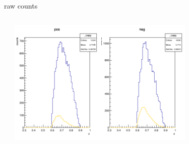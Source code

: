 \begin{frame}{raw counts}
\begin{columns}
\begin{column}[T]{0.5\textwidth}
\end{column}
\begin{column}[T]{0.5\textwidth}
\includegraphics[width = 0.7\textwidth]{results/yield/statistics/counts_x_Q2_z_0.45_4.750_0.70.png}
\end{column}
\end{columns}
\end{frame}
